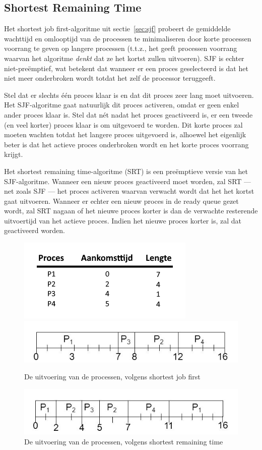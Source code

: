 \subsection{Shortest Remaining Time}

Het shortest job first-algoritme uit sectie~\ref{sec:sjf} probeert de gemiddelde wachttijd en omlooptijd van de processen te minimaliseren door korte processen voorrang te geven op langere processen (t.t.z., het geeft processen voorrang waarvan het algoritme \emph{denkt} dat ze het kortst zullen uitvoeren). SJF is echter niet-pre\"emptief, wat betekent dat wanneer er een proces geselecteerd is dat het niet meer onderbroken wordt totdat het zelf de processor teruggeeft.

Stel dat er slechts \'e\'en proces klaar is en dat dit proces zeer lang moet uitvoeren. Het SJF-algoritme gaat natuurlijk dit proces activeren, omdat er geen enkel ander proces klaar is. Stel dat n\'et nadat het proces geactiveerd is, er een tweede (en veel korter) proces klaar is om uitgevoerd te worden. Dit korte proces zal moeten wachten totdat het langere proces uitgevoerd is, alhoewel het eigenlijk beter is dat het actieve proces onderbroken wordt en het korte proces voorrang krijgt.

Het shortest remaining time-algoritme (SRT) is een pre\"emptieve versie van het SJF-algoritme. Wanneer een nieuw proces geactiveerd moet worden, zal SRT --- net zoals SJF --- het proces activeren waarvan verwacht wordt dat het het kortst gaat uitvoeren. Wanneer er echter een nieuw proces in de ready queue gezet wordt, zal SRT nagaan of het nieuwe proces korter is dan de verwachte resterende uitvoertijd van het actieve proces. Indien het nieuwe proces korter is, zal dat geactiveerd worden.

\begin{figure}
\centering
  \includegraphics[width=0.5\linewidth]{images/srtsjfvgl-1.png}
  \includegraphics[width=0.75\linewidth]{images/srtsjfvgl-sjf.png}
  \caption{De uitvoering van de processen, volgens shortest job first}\label{fig:execsjf}
  \includegraphics[width=0.75\linewidth]{images/srtsjfvgl-srt.png}
  \caption{De uitvoering van de processen, volgens shortest remaining time}\label{fig:execsrt}
\end{figure}

